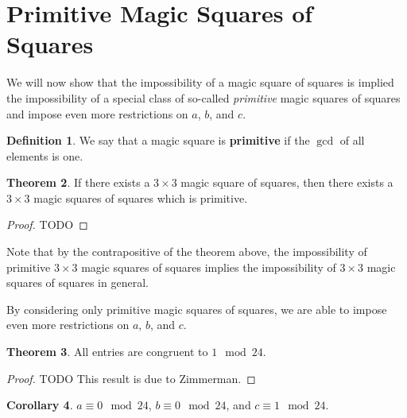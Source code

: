 \documentclass[11pt]{amsart}
\theoremstyle{definition}
\newtheorem{thm}{Theorem}[section]
\newtheorem{cor}[thm]{Corollary}
\newtheorem{defn}[thm]{Definition}
\begin{document}
\section{Primitive Magic Squares of Squares}
We will now show that the impossibility of a magic square of squares is implied the impossibility of a special class of so-called \emph{primitive} magic squares of squares and impose even more restrictions on $a$, $b$, and $c$.
\begin{defn}
  We say that a magic square is \textbf{primitive} if the $\gcd$ of all elements is one.
\end{defn}

\begin{thm}
  If there exists a $3 \times 3$ magic square of squares, then there exists a $3 \times 3$ magic squares of squares which is primitive.
  \begin{proof}
    TODO
  \end{proof}
\end{thm}
Note that by the contrapositive of the theorem above, the impossibility of primitive $3 \times 3$ magic squares of squares implies the impossibility of $3 \times 3$ magic squares of squares in general.

By considering only primitive magic squares of squares, we are able to impose even more restrictions on $a$, $b$, and $c$.
\begin{thm}
  All entries are congruent to $1 \mod 24$.
  \begin{proof}
    TODO This result is due to Zimmerman.
  \end{proof}
\end{thm}

\begin{cor}
  $a \equiv 0 \mod 24$, $b \equiv 0 \mod 24$, and $c \equiv 1 \mod 24$.
\end{cor}



\end{document}
